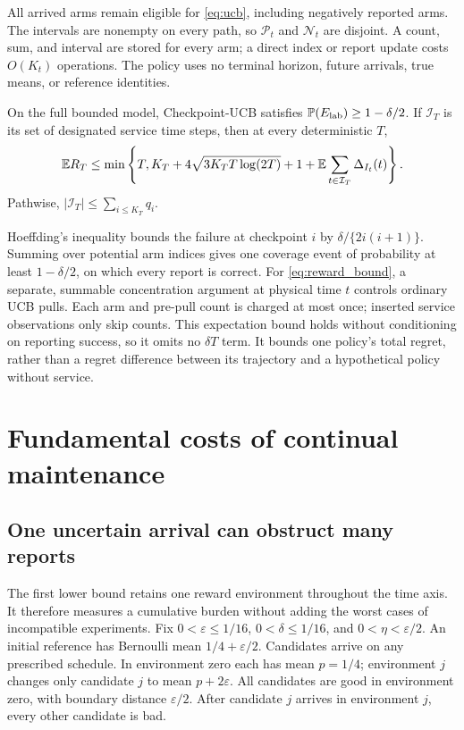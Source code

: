 \documentclass[11pt]{article}
\begin{document}
All arrived arms remain eligible for \eqref{eq:ucb}, including negatively
reported arms. The intervals are nonempty on every path, so
$\mathcal P_t$ and $\mathcal N_t$ are disjoint. A count, sum, and interval
are stored for every arm; a direct index or report update costs $O(K_t)$
operations. The policy uses no terminal horizon, future arrivals, true means,
or reference identities.

\begin{proposition}
\label{prop:reporting}
On the full bounded model, Checkpoint-UCB satisfies
$\mathbb P(E_{\rm lab})\ge1-\delta/2$. If $\mathcal I_T$ is its set of designated
service time steps, then at every deterministic $T$,
\begin{equation}
 \mathbb E R_T\le\min\left\{T,K_T+4\sqrt{3K_TT\log(2T)}+1+
                \mathbb E\sum_{t\in\mathcal I_T}\Delta_{I_t}(t)\right\}.
 \label{eq:reward_bound}
\end{equation}
Pathwise, $|\mathcal I_T|\le\sum_{i\le K_T}q_i$.
\end{proposition}

Hoeffding's inequality bounds the failure at checkpoint $i$ by
$\delta/\{2i(i+1)\}$. Summing over potential arm indices gives one coverage
event of probability at least $1-\delta/2$, on which every report is correct.
For \eqref{eq:reward_bound}, a separate, summable concentration argument at
physical time $t$ controls ordinary UCB pulls. Each arm and pre-pull count
is charged at most once; inserted service observations only skip counts.
This expectation bound holds without conditioning on reporting success,
so it omits no $\delta T$ term. It bounds one policy's total regret, rather
than a regret difference between its trajectory and a hypothetical policy
without service. \suppproof

\section{Fundamental costs of continual maintenance}
\label{sec:maintenance}

\subsection{One uncertain arrival can obstruct many reports}

The first lower bound retains one reward environment throughout the time axis.
It therefore measures a cumulative burden without adding the worst cases of
incompatible experiments. Fix
$0<\varepsilon\le1/16$, $0<\delta\le1/16$, and $0<\eta<\varepsilon/2$.
An initial reference has Bernoulli mean $1/4+\varepsilon/2$. Candidates arrive
on any prescribed schedule. In environment zero each has mean $p=1/4$;
environment $j$ changes only candidate $j$ to mean $p+2\varepsilon$.
All candidates are good in environment zero, with boundary distance
$\varepsilon/2$. After candidate $j$ arrives in environment $j$, every other
candidate is bad.
\end{document}
